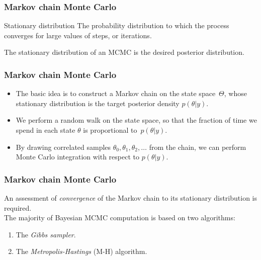 \documentclass{beamer}
\newcommand{\1}{\ensuremath{\mathbf{1}}}
\begin{document}
%
%
%
\begin{frame}\frametitle{Markov chain Monte Carlo}
	\begin{block}{Stationary distribution}
		The probability distribution to which the process converges for large values of steps, or iterations.
	\end{block}
	The stationary distribution of an MCMC is the desired posterior distribution.
\end{frame}
%
%
%
\begin{frame}\frametitle{Markov chain Monte Carlo}
	\begin{itemize}
		\item The basic idea is to construct a Markov chain on the state space~$\Theta$, whose stationary distribution is the target posterior density $p(\theta|y)$.
		\item We perform a random walk on the state space, so that the fraction of time we spend in each state $\theta$ is proportional to~$p(\theta|y)$.
		\item By drawing correlated samples $\theta_0, \theta_1 , \theta_2 , \ldots$ from the chain, we can perform Monte Carlo integration with respect to $p(\theta|y)$.
	\end{itemize}
\end{frame}
%
%
%
\begin{frame}\frametitle{Markov chain Monte Carlo}
	An assessment of \emph{convergence} of the Markov chain to its stationary distribution is required.\\[2ex]
	The majority of Bayesian MCMC computation is based on two algorithms:
	\begin{enumerate}
		\item The \emph{Gibbs sampler}.
		\item The \emph{Metropolis-Hastings} (M-H) algorithm.
	\end{enumerate}
\end{frame}
%
%
%
\end{document}
